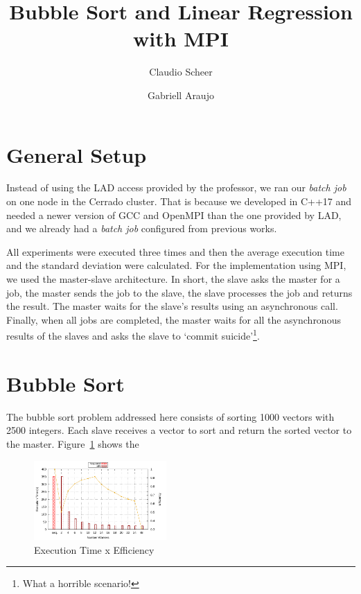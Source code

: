 \documentclass[10pt, twocolumn]{report}
\begin{document}
\title{Bubble Sort and Linear Regression with MPI}

\author[1]{Claudio Scheer}
\author[1]{Gabriell Araujo}

\maketitle

\section {General Setup}
Instead of using the LAD access provided by the professor, we ran our \textit{batch job} on one node in the Cerrado cluster. That is because we developed in C++17 and needed a newer version of GCC and OpenMPI than the one provided by LAD, and we already had a \textit{batch job} configured from previous works.

All experiments were executed three times and then the average execution time and the standard deviation were calculated. For the implementation using MPI, we used the master-slave architecture. In short, the slave asks the master for a job, the master sends the job to the slave, the slave processes the job and returns the result. The master waits for the slave's results using an asynchronous call. Finally, when all jobs are completed, the master waits for all the asynchronous results of the slaves and asks the slave to `commit suicide'\footnote{What a horrible scenario!}.

\section{Bubble Sort}
The bubble sort problem addressed here consists of sorting 1000 vectors with 2500 integers. Each slave receives a vector to sort and return the sorted vector to the master. Figure~\ref{fig:bubble-sort-time} shows the

\begin{figure}[h]
	\centering
	\includegraphics[width=0.45\textwidth]{../logs/scripts/bubble-sort-time.pdf}
	\caption{Execution Time x Efficiency}
	\label{fig:bubble-sort-time}
\end{figure}
\end{document}
